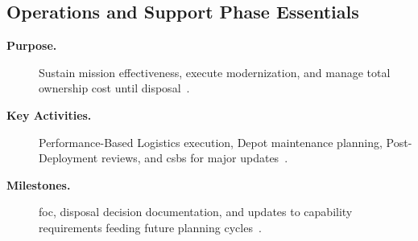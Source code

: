 \documentclass[../main.tex]{subfiles}
\begin{document}
\subsection{Operations and Support Phase Essentials}
\begin{description}
  \item[\textbf{Purpose.}] Sustain mission effectiveness, execute modernization, and manage total ownership cost until disposal~\autocite{DoDI5000-85}.
  \item[\textbf{Key Activities.}] Performance-Based Logistics execution, Depot maintenance planning, Post-Deployment reviews, and \acp{csb} for major updates~\autocite{DoDI5000-85}.
  \item[\textbf{Milestones.}] \ac{foc}, disposal decision documentation, and updates to capability requirements feeding future planning cycles~\autocite{DoDI5000-85}.
\end{description}

\end{document}
